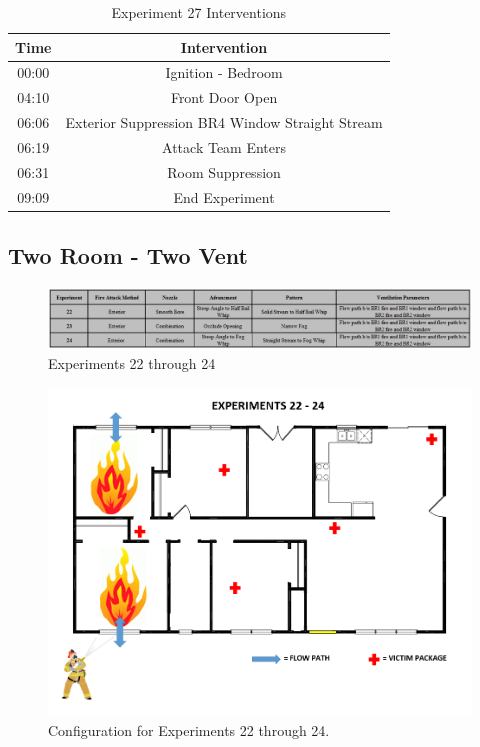\documentclass[12pt,oneside]{book}
\begin{document}
\begin{table}[H]
	\centering
	\caption{Experiment 27 Interventions}
	\begin{tabular}{|c|c|} 
		\hline
		Time & Intervention \\ \hline \hline
		00:00 & Ignition - Bedroom \\ \hline
		04:10 & Front Door Open \\ \hline
		06:06 & Exterior Suppression BR4 Window Straight Stream \\ \hline
		06:19 & Attack Team Enters\\ \hline
		06:31 & Room Suppression \\ \hline 
		09:09 & End Experiment\\ \hline
	\end{tabular}
	\label{Table:Exp27Interventions}
\end{table}

\clearpage

\subsection{Two Room - Two Vent}

\begin{figure}[H]
	\centering
	\includegraphics[width=7in]{Figures/General/Exp22to24.png}
	\caption{Experiments 22 through 24}
	\label{fig:Exp22to24}
\end{figure}

\begin{figure}[H]
	\centering
	\includegraphics[width=5in]{Figures/General/Exps22through24.png}
	\caption{Configuration for Experiments 22 through 24.}
	\label{fig:ExpConfig22to24}
\end{figure}
\end{document}

